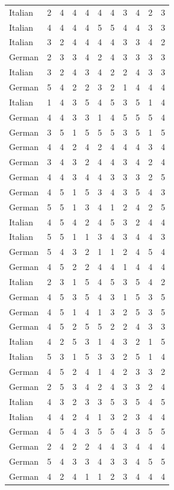 \begin{table}[htbp]
\begin{tabular}{lcccccccccc}
Italian & 2 & 4 & 4 & 4 & 4 & 4 & 3 & 4 & 2 & 3 \\
Italian & 4 & 4 & 4 & 4 & 5 & 5 & 4 & 4 & 3 & 3 \\
Italian & 3 & 2 & 4 & 4 & 4 & 4 & 3 & 3 & 4 & 2 \\
German & 2 & 3 & 3 & 4 & 2 & 4 & 3 & 3 & 3 & 3 \\
Italian & 3 & 2 & 4 & 3 & 4 & 2 & 2 & 4 & 3 & 3 \\
German & 5 & 4 & 2 & 2 & 3 & 2 & 1 & 4 & 4 & 4 \\
Italian & 1 & 4 & 3 & 5 & 4 & 5 & 3 & 5 & 1 & 4 \\
German & 4 & 4 & 3 & 3 & 1 & 4 & 5 & 5 & 5 & 4 \\
German & 3 & 5 & 1 & 5 & 5 & 5 & 3 & 5 & 1 & 5 \\
German & 4 & 4 & 2 & 4 & 2 & 4 & 4 & 4 & 3 & 4 \\
German & 3 & 4 & 3 & 2 & 4 & 4 & 3 & 4 & 2 & 4 \\
German & 4 & 4 & 3 & 4 & 4 & 3 & 3 & 3 & 2 & 5 \\
German & 4 & 5 & 1 & 5 & 3 & 4 & 3 & 5 & 4 & 3 \\
German & 5 & 5 & 1 & 3 & 4 & 1 & 2 & 4 & 2 & 5 \\
Italian & 4 & 5 & 4 & 2 & 4 & 5 & 3 & 2 & 4 & 4 \\
Italian & 5 & 5 & 1 & 1 & 3 & 4 & 3 & 4 & 4 & 3 \\
German & 5 & 4 & 3 & 2 & 1 & 1 & 2 & 4 & 5 & 4 \\
German & 4 & 5 & 2 & 2 & 4 & 4 & 1 & 4 & 4 & 4 \\
Italian & 2 & 3 & 1 & 5 & 4 & 5 & 3 & 5 & 4 & 2 \\
German & 4 & 5 & 3 & 5 & 4 & 3 & 1 & 5 & 3 & 5 \\
German & 4 & 5 & 1 & 4 & 1 & 3 & 2 & 5 & 3 & 5 \\
German & 4 & 5 & 2 & 5 & 5 & 2 & 2 & 4 & 3 & 3 \\
Italian & 4 & 2 & 5 & 3 & 1 & 4 & 3 & 2 & 1 & 5 \\
Italian & 5 & 3 & 1 & 5 & 3 & 3 & 2 & 5 & 1 & 4 \\
German & 4 & 5 & 2 & 4 & 1 & 4 & 2 & 3 & 3 & 2 \\
German & 2 & 5 & 3 & 4 & 2 & 4 & 3 & 3 & 2 & 4 \\
Italian & 4 & 3 & 2 & 3 & 3 & 5 & 3 & 5 & 4 & 5 \\
Italian & 4 & 4 & 2 & 4 & 1 & 3 & 2 & 3 & 4 & 4 \\
German & 4 & 5 & 4 & 3 & 5 & 5 & 4 & 3 & 5 & 5 \\
German & 2 & 4 & 2 & 2 & 4 & 4 & 3 & 4 & 4 & 4 \\
German & 5 & 4 & 3 & 3 & 4 & 3 & 3 & 4 & 5 & 5 \\
German & 4 & 2 & 4 & 1 & 1 & 2 & 3 & 4 & 4 & 4 \\
\bottomrule
\end{tabular}
\end{table}
